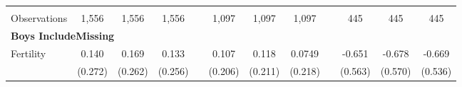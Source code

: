 \begin{landscape}
\begin{table}[htpb!]
\begin{center}
\begin{tabular}{lcccp{2mm}cccp{2mm}ccc}
\begin{footnotesize}\end{footnotesize}&\begin{footnotesize}\end{footnotesize}&\begin{footnotesize}\end{footnotesize}&\begin{footnotesize}\end{footnotesize}&\begin{footnotesize}\end{footnotesize}&\begin{footnotesize}\end{footnotesize}&\begin{footnotesize}\end{footnotesize}&\begin{footnotesize}\end{footnotesize}&\begin{footnotesize}\end{footnotesize}&\begin{footnotesize}\end{footnotesize}&\begin{footnotesize}\end{footnotesize}&\begin{footnotesize}\end{footnotesize}\\Observations&1,556&1,556&1,556&&1,097&1,097&1,097&&445&445&445\\
\multicolumn{12}{l}{\textbf{Boys IncludeMissing}}\\ 
Fertility&0.140&0.169&0.133&&0.107&0.118&0.0749&&-0.651&-0.678&-0.669\\
&(0.272)&(0.262)&(0.256)&&(0.206)&(0.211)&(0.218)&&(0.563)&(0.570)&(0.536)\\

\end{tabular}
\end{center}
\end{table}
\end{landscape}
